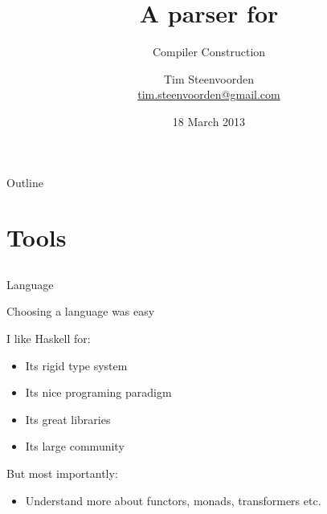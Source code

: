 



\subtitle {Compiler Construction}
\title    {A parser for \SPL}
\author   [Tim Steenvoorden]
          {Tim Steenvoorden\\
           \medskip
           {\small \url{tim.steenvoorden@gmail.com}}}%
\date     {18 March 2013}

\begin{frame}
  \titlepage
\end{frame}

\begin{frame}{Outline}
  \tableofcontents
\end{frame}

\section{Tools}
\subsection*{}

\begin{frame}{Language}
  
  Choosing a language was easy
  
  I like Haskell for:

  \begin{itemize}
    \item Its rigid type system
    \item Its nice programing paradigm
    \item Its great libraries
    \item Its large community
  \end{itemize}

  But most importantly:

  \begin{itemize}
    \item Understand more about functors, monads, transformers etc.
  \end{itemize}

\end{frame}

